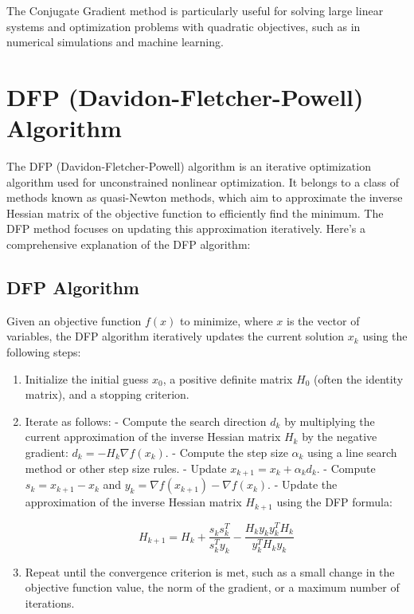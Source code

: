 \documentclass[a4paper]{article}
\begin{document}
The Conjugate Gradient method is particularly useful for solving large linear systems and optimization problems with quadratic objectives, such as in numerical simulations and machine learning.

\section{DFP (Davidon-Fletcher-Powell) Algorithm}

The DFP (Davidon-Fletcher-Powell) algorithm is an iterative optimization algorithm used for unconstrained nonlinear optimization. It belongs to a class of methods known as quasi-Newton methods, which aim to approximate the inverse Hessian matrix of the objective function to efficiently find the minimum. The DFP method focuses on updating this approximation iteratively. Here's a comprehensive explanation of the DFP algorithm:

\subsection{DFP Algorithm}

Given an objective function $f(x)$ to minimize, where $x$ is the vector of variables, the DFP algorithm iteratively updates the current solution $x_k$ using the following steps:

\begin{enumerate}
  \item Initialize the initial guess $x_0$, a positive definite matrix $H_0$ (often the identity matrix), and a stopping criterion.

  \item Iterate as follows:
     - Compute the search direction $d_k$ by multiplying the current approximation of the inverse Hessian matrix $H_k$ by the negative gradient: $d_k = -H_k \nabla f(x_k)$.
     - Compute the step size $\alpha_k$ using a line search method or other step size rules.
     - Update $x_{k+1} = x_k + \alpha_k d_k$.
     - Compute $s_k = x_{k+1} - x_k$ and $y_k = \nabla f(x_{k+1}) - \nabla f(x_k)$.
     - Update the approximation of the inverse Hessian matrix $H_{k+1}$ using the DFP formula:

\[
H_{k+1} = H_k + \frac{s_k s_k^T}{s_k^T y_k} - \frac{H_k y_k y_k^T H_k}{y_k^T H_k y_k}
\]

  \item Repeat until the convergence criterion is met, such as a small change in the objective function value, the norm of the gradient, or a maximum number of iterations.
\end{enumerate}
\end{document}
